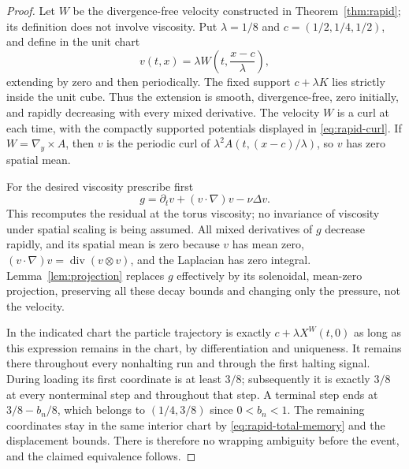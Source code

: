 \begin{proof}
Let $W$ be the divergence-free velocity constructed in
Theorem~\ref{thm:rapid}; its definition does not involve viscosity.
Put $\lambda=1/8$ and $c=(1/2,1/4,1/2)$, and define in the unit chart
\[
 v(t,x)=\lambda W\left(t,\frac{x-c}{\lambda}\right),
\]
extending by zero and then periodically.  The fixed support $c+\lambda K$
lies strictly inside the unit cube.  Thus the extension is smooth,
divergence-free, zero initially, and rapidly decreasing with every mixed
derivative. The velocity $W$ is a curl at each time, with the compactly
supported potentials displayed in \eqref{eq:rapid-curl}.
If $W=\nabla_y\times A$, then $v$ is the periodic curl of
$\lambda^2A(t,(x-c)/\lambda)$, so $v$ has zero spatial mean.

For the desired viscosity prescribe first
\[
 g=\partial_t v+(v\cdot\nabla)v-\nu\Delta v.
\]
This recomputes the residual at the torus viscosity; no invariance of
viscosity under spatial scaling is being assumed.  All mixed derivatives
of $g$ decrease rapidly, and its spatial mean is zero because $v$ has
mean zero, $(v\cdot\nabla)v=\operatorname{div}(v\otimes v)$, and
the Laplacian has zero integral.  Lemma~\ref{lem:projection} replaces $g$
effectively by its solenoidal, mean-zero projection, preserving all
these decay bounds and changing only the pressure, not the velocity.

In the indicated chart the particle trajectory is exactly
$c+\lambda X^W(t,0)$ as long as this expression remains in the chart,
by differentiation and uniqueness.  It remains there throughout every
nonhalting run and through the first halting signal.  During loading
its first coordinate is at least $3/8$; subsequently it is exactly
$3/8$ at every nonterminal step and throughout that step.  A terminal
step ends at $3/8-b_n/8$, which belongs to $(1/4,3/8)$ since $0<b_n<1$.
The remaining coordinates stay in the same interior chart by
\eqref{eq:rapid-total-memory} and the displacement bounds.  There is
therefore no wrapping ambiguity before the event, and the claimed
equivalence follows.
\end{proof}

